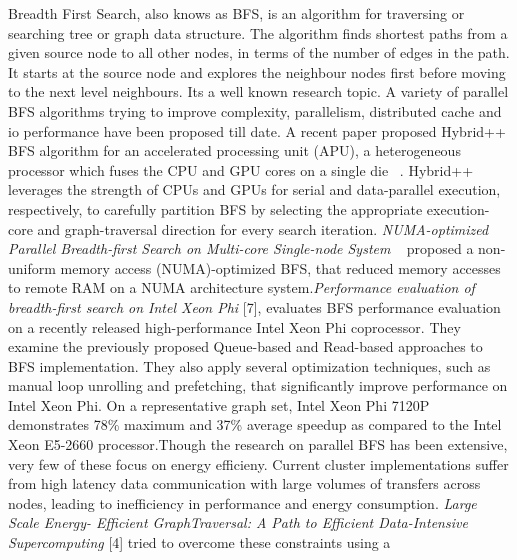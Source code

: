 Breadth First Search, also knows as BFS, is an algorithm for
traversing or searching tree or graph data structure. The algorithm
finds shortest paths from a given source node to all other nodes, in
terms of the number of edges in the path. It starts at the source node
and explores the neighbour nodes first before moving to the next level
neighbours.  Its a well known research topic. A variety of parallel
BFS algorithms trying to improve complexity, parallelism, distributed
cache and io performance have been proposed till date.\newline
A recent paper proposed Hybrid++ BFS algorithm for an accelerated
processing unit (APU), a heterogeneous processor which fuses the CPU
and GPU cores on a single die ~\cite{HYBRIS}. Hybrid++ leverages the
strength of CPUs and GPUs for serial and data-parallel execution,
respectively, to carefully partition BFS by selecting the appropriate
execution-core and graph-traversal direction for every search
iteration.\newline
\emph{NUMA-optimized Parallel Breadth-first Search on Multi-core
Single-node System} ~\cite{NUMA-BFS} proposed a non-uniform memory
access (NUMA)-optimized BFS, that reduced memory accesses to remote
RAM on a NUMA architecture system.\newline \emph{Performance
evaluation of breadth-first search on Intel Xeon Phi} [7], evaluates
BFS performance evaluation on a recently released high-performance
Intel Xeon Phi coprocessor. They examine the previously proposed
Queue-based and Read-based approaches to BFS implementation. They also
apply several optimization techniques, such as manual loop unrolling
and prefetching, that significantly improve performance on Intel Xeon
Phi. On a representative graph set, Intel Xeon Phi 7120P demonstrates
78\% maximum and 37\% average speedup as compared to the Intel Xeon
E5-2660 processor.\newline Though the research on parallel BFS has
been extensive, very few of these focus on energy efficieny.\newline
Current cluster implementations suffer from high latency data
communication with large volumes of transfers across nodes, leading to
inefficiency in performance and energy consumption. \emph{Large Scale
Energy- Efficient GraphTraversal: A Path to Efficient Data-Intensive
Supercomputing} [4] tried to overcome these constraints using a
